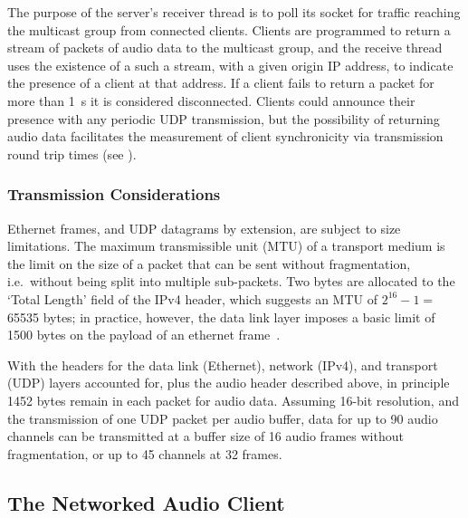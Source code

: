 
The purpose of the server's receiver thread is to poll its socket for traffic
reaching the multicast group from connected clients.
Clients are programmed to return a stream of packets of audio data to the
multicast group, and the receive thread uses the existence of a such a stream,
with a given origin IP address, to indicate the presence of a client at that
address.
If a client fails to return a packet for more than \qty{1}{\second} it is
considered disconnected.
Clients could announce their presence with any periodic UDP transmission, but
the possibility of returning audio data facilitates the measurement of client
synchronicity via transmission round trip times (see
).

\subsubsection{Transmission Considerations}\label{subsubsec:transmission-considerations}

Ethernet frames, and UDP datagrams by extension, are subject to size
limitations.
The maximum transmissible unit (MTU) of a transport medium is the limit on the
size of a packet that can be sent without fragmentation, i.e.\ without being
split into multiple sub-packets.
Two bytes are allocated to the `Total Length' field of the IPv4 header, which
suggests an MTU of $2^{16}-1=~$\num{65535} bytes;
in practice, however, the data link layer imposes a basic limit of \num{1500}
bytes on the payload of an ethernet
frame~\citep{schiavoni_alternatives_2013,ieee_ieee_2018}.

With the headers for the data link (Ethernet), network (IPv4), and transport
(UDP) layers accounted for, plus the audio header described above, in principle
\num{1452} bytes remain in each packet for audio data.
Assuming 16-bit resolution, and the transmission of one UDP packet per audio
buffer, data for up to 90 audio channels can be transmitted at a buffer size of
16 audio frames without fragmentation, or up to 45 channels at 32 frames.

\subsection{The Networked Audio Client}\label{subsec:networked-audio-client}

